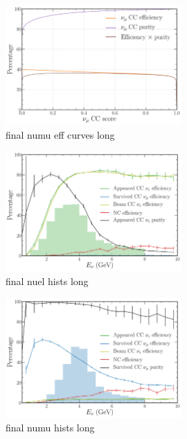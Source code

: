 \begin{figure} %
    \includegraphics[width=0.6\textwidth]{diagrams/6-cvn/chipsnet/final_numu_eff_curves.pdf}
    \caption[final numu eff curves short]
    {final numu eff curves long}
    \label{fig:final_numu_eff_curves}
\end{figure}

\begin{figure} %
    \includegraphics[width=0.6\textwidth]{diagrams/6-cvn/chipsnet/final_nuel_hists.pdf}
    \caption[final nuel hists short]
    {final nuel hists long}
    \label{fig:final_nuel_hists}
\end{figure}

\begin{figure} %
    \includegraphics[width=0.6\textwidth]{diagrams/6-cvn/chipsnet/final_numu_hists.pdf}
    \caption[final numu hists short]
    {final numu hists long}
    \label{fig:final_numu_hists}
\end{figure}

